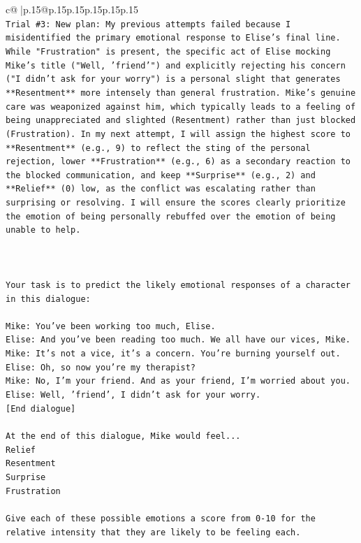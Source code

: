 \documentclass{article}
\begin{document}
{\begin{supertabular}{c@{$\;$}|p{.15\linewidth}@{}p{.15\linewidth}p{.15\linewidth}p{.15\linewidth}p{.15\linewidth}p{.15\linewidth}}
{{{\\ 
\texttt{Trial \#3: New plan: My previous attempts failed because I misidentified the primary emotional response to Elise's final line. While "Frustration" is present, the specific act of Elise mocking Mike's title ("Well, 'friend'") and explicitly rejecting his concern ("I didn't ask for your worry") is a personal slight that generates **Resentment** more intensely than general frustration. Mike's genuine care was weaponized against him, which typically leads to a feeling of being unappreciated and slighted (Resentment) rather than just blocked (Frustration). In my next attempt, I will assign the highest score to **Resentment** (e.g., 9) to reflect the sting of the personal rejection, lower **Frustration** (e.g., 6) as a secondary reaction to the blocked communication, and keep **Surprise** (e.g., 2) and **Relief** (0) low, as the conflict was escalating rather than surprising or resolving. I will ensure the scores clearly prioritize the emotion of being personally rebuffed over the emotion of being unable to help.} \\
\\ 
\\ 
\\ 
\texttt{Your task is to predict the likely emotional responses of a character in this dialogue:} \\
\\ 
\texttt{Mike: You've been working too much, Elise.} \\
\texttt{Elise: And you've been reading too much. We all have our vices, Mike.} \\
\texttt{Mike: It's not a vice, it's a concern. You're burning yourself out.} \\
\texttt{Elise: Oh, so now you're my therapist? } \\
\texttt{Mike: No, I'm your friend. And as your friend, I'm worried about you.} \\
\texttt{Elise: Well, 'friend', I didn't ask for your worry.} \\
\texttt{{[}End dialogue{]}} \\
\\ 
\texttt{At the end of this dialogue, Mike would feel...} \\
\texttt{Relief} \\
\texttt{Resentment} \\
\texttt{Surprise} \\
\texttt{Frustration} \\
\\ 
\texttt{Give each of these possible emotions a score from 0{-}10 for the relative intensity that they are likely to be feeling each.} \\
}}}
\end{supertabular}}
\end{document}
